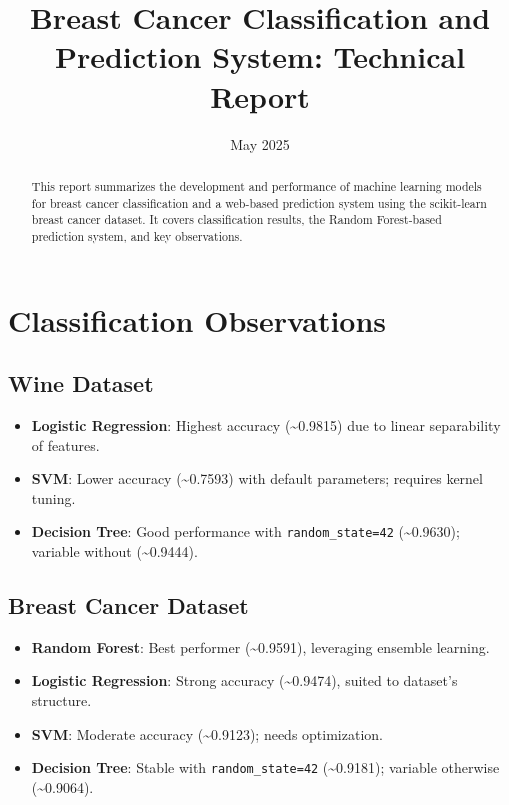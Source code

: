 \documentclass[a4paper,12pt]{article}
\begin{document}
\title{Breast Cancer Classification and Prediction System: Technical Report}
\author{}
\date{May 2025}
\maketitle

\begin{abstract}
This report summarizes the development and performance of machine learning models for breast cancer classification and a web-based prediction system using the scikit-learn breast cancer dataset. It covers classification results, the Random Forest-based prediction system, and key observations.
\end{abstract}

\section{Classification Observations}
\subsection{Wine Dataset}
\begin{itemize}[noitemsep]
    \item \textbf{Logistic Regression}: Highest accuracy (\textasciitilde0.9815) due to linear separability of features.
    \item \textbf{SVM}: Lower accuracy (\textasciitilde0.7593) with default parameters; requires kernel tuning.
    \item \textbf{Decision Tree}: Good performance with \texttt{random\_state=42} (\textasciitilde0.9630); variable without (\textasciitilde0.9444).
\end{itemize}

\subsection{Breast Cancer Dataset}
\begin{itemize}[noitemsep]
    \item \textbf{Random Forest}: Best performer (\textasciitilde0.9591), leveraging ensemble learning.
    \item \textbf{Logistic Regression}: Strong accuracy (\textasciitilde0.9474), suited to dataset’s structure.
    \item \textbf{SVM}: Moderate accuracy (\textasciitilde0.9123); needs optimization.
    \item \textbf{Decision Tree}: Stable with \texttt{random\_state=42} (\textasciitilde0.9181); variable otherwise (\textasciitilde0.9064).
\end{itemize}
\end{document}
